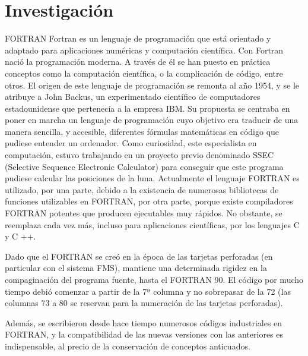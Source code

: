 \documentclass{article}
\begin{document}
	\section{Investigación}\label{sec:ejercicios}
	
	FORTRAN
Fortran es un lenguaje de programación que está orientado y adaptado para aplicaciones numéricas y computación científica.
Con Fortran nació la programación moderna. A través de él se han puesto en práctica conceptos como la computación científica, o la complicación de código, entre otros.
El origen de este lenguaje de programación se remonta al año 1954, y se le atribuye a John Backus, un experimentado científico de computadores estadounidense que pertenecía a la empresa IBM.
Su propuesta se centraba en poner en marcha un lenguaje de programación cuyo objetivo era traducir de una manera sencilla, y accesible, diferentes fórmulas matemáticas en código que pudiese entender un ordenador.
Como curiosidad, este especialista en computación, estuvo trabajando en un proyecto previo denominado SSEC (Selective Sequence Electronic Calculator) para conseguir que este programa pudiese calcular las posiciones de la luna.
Actualmente el lenguaje FORTRAN es utilizado, por una parte, debido a la existencia de numerosas bibliotecas de funciones utilizables en FORTRAN, por otra parte, porque existe compiladores FORTRAN potentes que producen ejecutables muy rápidos. No obstante, se reemplaza cada vez más, incluso para aplicaciones científicas, por los lenguajes C y C ++.

Dado que el FORTRAN se creó en la época de las tarjetas perforadas (en particular con el sistema FMS), mantiene una determinada rigidez en la compaginación del programa fuente, hasta el FORTRAN 90. El código por mucho tiempo debió comenzar a partir de la 7ª columna y no sobrepasar de la 72 (las columnas 73 a 80 se reservan para la numeración de las tarjetas perforadas).

Además, se escribieron desde hace tiempo numerosos códigos industriales en FORTRAN, y la compatibilidad de las nuevas versiones con las anteriores es indispensable, al precio de la conservación de conceptos anticuados.
\end{document}
